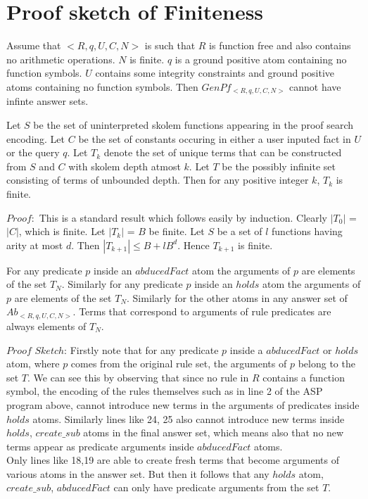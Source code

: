 \documentclass[sigconf]{acmart}
\begin{document}
\section{Proof sketch of Finiteness}\label{sec:proof_finiteness}
\begin{theorem}[Finiteness]\label{Finiteness}
Assume that $<R,q,U,C,N>$ is such that $R$ is function free and also contains no arithmetic operations. $N$ is finite. $q$ is a ground positive atom containing no function symbols. $U$ contains some integrity constraints and ground positive atoms containing no function symbols. Then $GenPf_{<R,q,U,C,N>}$ cannot have infinte answer sets. 
\end{theorem}
\begin{lemma}
Let $S$ be the set of uninterpreted skolem functions appearing in the proof search encoding. Let $C$ be the set of constants occuring in either a user inputed fact in $U$ or the query $q$. Let $T_{k}$ denote the set of unique terms that can be constructed from $S$ and $C$ with skolem depth atmost $k$. Let $T$ be the possibly infinite set consisting of terms of unbounded depth. Then for any positive integer $k$, $T_{k}$ is finite.
\end{lemma}

$Proof:$ This is a standard result which follows easily by induction. Clearly $|T_{0}|$ = $|C|$, which is finite. Let $|T_{k}|$ = $B$ be finite. Let $S$ be a set of $l$ functions having arity at most $d$. Then $|T_{k+1}|\leq B + lB^{d}$. Hence $T_{k+1}$ is finite.  

\begin{lemma}
 For any predicate $p$ inside an $abducedFact$ atom the arguments of $p$ are elements of the set $T_{N}$. Similarly for any predicate $p$ inside an $holds$ atom the arguments of $p$ are elements of the set $T_{N}$. Similarly for the other atoms in any answer set of $Ab_{<R,q,U,C,N>}$. Terms that correspond to arguments of rule predicates are always elements of $T_{N}$.
\end{lemma}

$Proof$ $Sketch$: Firstly note that for any predicate $p$ inside a $abducedFact$ or $holds$ atom, where $p$ comes from the original rule set, the arguments of $p$ belong to the set $T$. We can see this by observing that since no rule in $R$ contains a function symbol, the encoding of the rules themselves such as in line 2 of the ASP program above, cannot introduce new terms in the arguments of predicates inside $holds$ atoms. Similarly lines like 24, 25 also cannot introduce new terms inside $holds$, $create\_sub$ atoms in the final answer set, which means also that no new terms appear as predicate arguments inside $abducedFact$ atoms. \\ Only lines like 18,19 are able to create fresh terms that become arguments of various atoms in the answer set. But then it follows that any $holds$ atom, $create\_sub$, $abducedFact$ can only have predicate arguments from the set $T$.    
\end{document}
